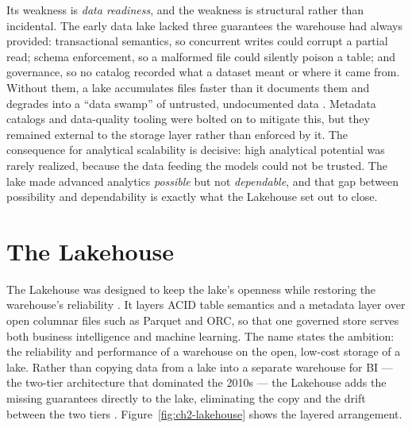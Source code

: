 Its weakness is \textit{data readiness}, and the weakness is structural rather than incidental. The early data lake lacked three guarantees the warehouse had always provided: transactional semantics, so concurrent writes could corrupt a partial read; schema enforcement, so a malformed file could silently poison a table; and governance, so no catalog recorded what a dataset meant or where it came from. Without them, a lake accumulates files faster than it documents them and degrades into a ``data swamp'' of untrusted, undocumented data \parencite{nambiar2022, harby2024}. Metadata catalogs and data-quality tooling were bolted on to mitigate this, but they remained external to the storage layer rather than enforced by it. The consequence for analytical scalability is decisive: high analytical potential was rarely realized, because the data feeding the models could not be trusted. The lake made advanced analytics \textit{possible} but not \textit{dependable}, and that gap between possibility and dependability is exactly what the Lakehouse set out to close.

\section{The Lakehouse}
\label{sec:ch2-lakehouse}

The Lakehouse was designed to keep the lake's openness while restoring the warehouse's reliability \parencite{armbrust2021}. It layers ACID table semantics and a metadata layer over open columnar files such as Parquet and ORC, so that one governed store serves both business intelligence and machine learning. The name states the ambition: the reliability and performance of a warehouse on the open, low-cost storage of a lake. Rather than copying data from a lake into a separate warehouse for BI --- the two-tier architecture that dominated the 2010s --- the Lakehouse adds the missing guarantees directly to the lake, eliminating the copy and the drift between the two tiers \parencite{armbrust2021, harby2024}. Figure~\ref{fig:ch2-lakehouse} shows the layered arrangement.

